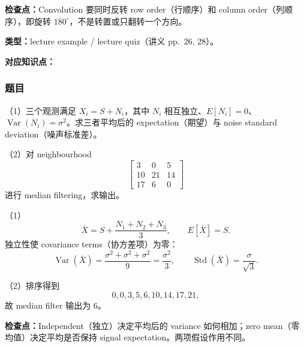 \textbf{检查点：}Convolution 要同时反转 row order（行顺序）和 column order（列顺序），即旋转 $180^\circ$，不是转置或只翻转一个方向。

\clearpage
{}

\textbf{类型：}lecture example / lecture quiz（讲义 pp.~26, 28）。

\textbf{对应知识点：}

\subsubsection*{题目}

（1）三个观测满足 $X_i=S+N_i$，其中 $N_i$ 相互独立、$E[N_i]=0$、$\operatorname{Var}(N_i)=\sigma^2$。求三者平均后的 expectation（期望）与 noise standard deviation（噪声标准差）。

（2）对 neighbourhood
\[
  \begin{bmatrix}
    3&0&5\\10&21&14\\17&6&0
  \end{bmatrix}
\]
进行 median filtering，求输出。

\begin{checkedsolution}
（1）
\[
  \bar X=S+\frac{N_1+N_2+N_3}{3},
  \qquad E[\bar X]=\boxed{S}.
\]
独立性使 covariance terms（协方差项）为零：
\[
  \operatorname{Var}(\bar X)
  =\frac{\sigma^2+\sigma^2+\sigma^2}{9}
  =\frac{\sigma^2}{3},
  \qquad
  \operatorname{Std}(\bar X)=\boxed{\frac{\sigma}{\sqrt3}}.
\]

（2）排序得到
\[
  0,0,3,5,\boxed{6},10,14,17,21,
\]
故 median filter 输出为 $\boxed{6}$。
\end{checkedsolution}

\textbf{检查点：}Independent（独立）决定平均后的 variance 如何相加；zero mean（零均值）决定平均是否保持 signal expectation。两项假设作用不同。
